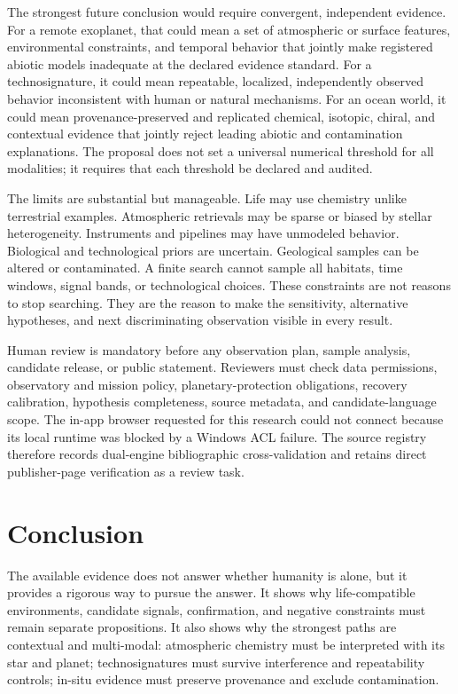 \documentclass[conference]{IEEEtran}
\begin{document}
The strongest future conclusion would require convergent, independent evidence. For a remote exoplanet, that could mean a set of atmospheric or surface features, environmental constraints, and temporal behavior that jointly make registered abiotic models inadequate at the declared evidence standard. For a technosignature, it could mean repeatable, localized, independently observed behavior inconsistent with human or natural mechanisms. For an ocean world, it could mean provenance-preserved and replicated chemical, isotopic, chiral, and contextual evidence that jointly reject leading abiotic and contamination explanations. The proposal does not set a universal numerical threshold for all modalities; it requires that each threshold be declared and audited.

The limits are substantial but manageable. Life may use chemistry unlike terrestrial examples. Atmospheric retrievals may be sparse or biased by stellar heterogeneity. Instruments and pipelines may have unmodeled behavior. Biological and technological priors are uncertain. Geological samples can be altered or contaminated. A finite search cannot sample all habitats, time windows, signal bands, or technological choices. These constraints are not reasons to stop searching. They are the reason to make the sensitivity, alternative hypotheses, and next discriminating observation visible in every result.

Human review is mandatory before any observation plan, sample analysis, candidate release, or public statement. Reviewers must check data permissions, observatory and mission policy, planetary-protection obligations, recovery calibration, hypothesis completeness, source metadata, and candidate-language scope. The in-app browser requested for this research could not connect because its local runtime was blocked by a Windows ACL failure. The source registry therefore records dual-engine bibliographic cross-validation and retains direct publisher-page verification as a review task.

\section{Conclusion}

The available evidence does not answer whether humanity is alone, but it provides a rigorous way to pursue the answer. It shows why life-compatible environments, candidate signals, confirmation, and negative constraints must remain separate propositions. It also shows why the strongest paths are contextual and multi-modal: atmospheric chemistry must be interpreted with its star and planet; technosignatures must survive interference and repeatability controls; in-situ evidence must preserve provenance and exclude contamination.
\end{document}
